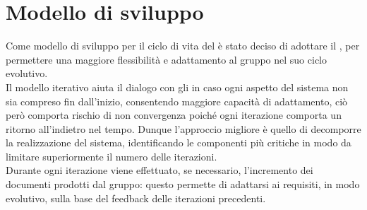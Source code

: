 \clearpage
\section{Modello di sviluppo}
Come modello di sviluppo per il ciclo di vita del  è stato deciso di adottare il \emph{}, per permettere una maggiore flessibilità e adattamento al gruppo nel suo ciclo evolutivo.\\[0.5cm]
Il modello iterativo aiuta il dialogo con gli  in caso ogni aspetto del sistema non sia compreso fin dall'inizio, consentendo maggiore capacità di adattamento, ciò però comporta rischio di non convergenza poiché ogni iterazione comporta un ritorno all'indietro nel tempo.
Dunque l'approccio migliore è quello di decomporre la realizzazione del sistema, identificando le componenti più critiche in modo da limitare superiormente il numero delle iterazioni.\\
Durante ogni iterazione viene effettuato, se necessario, l'incremento dei documenti prodotti dal gruppo: questo permette di adattarsi ai requisiti, in modo evolutivo, sulla base del feedback delle iterazioni precedenti.
